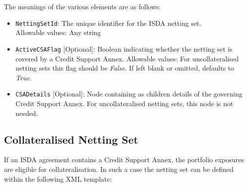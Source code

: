 The meanings of the various elements are as follows:
\begin{itemize}
\item \lstinline!NettingSetId!: The unique identifier for the ISDA netting set.
\ifdefined{}\fi \\
Allowable values: Any string
\item \lstinline!ActiveCSAFlag! [Optional]: Boolean indicating whether the netting set is
  covered by a Credit Support Annex. 
  Allowable values: For uncollateralised netting sets
  this flag should be \emph{False}. If left blank or omitted, defaults to \emph{True}.
\item \lstinline!CSADetails! [Optional]: Node containing as children details of the governing
  Credit Support Annex. For uncollateralised netting sets, this node is not needed.
\end{itemize}
\subsection{Collateralised Netting Set} \label{sec:CollNettingSet}
If an ISDA agreement contains a Credit Support Annex, the
portfolio exposures are eligible for collateralisation. In such a
case the netting set can be defined within the following XML template:

